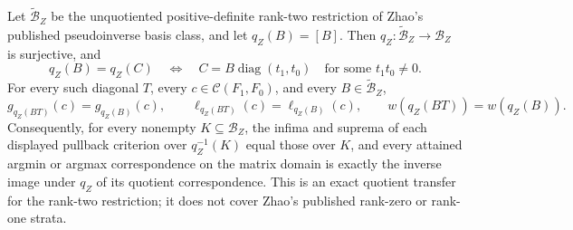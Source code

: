 Let \(\widetilde{\mathcal B}_Z\) be the unquotiented positive-definite rank-two restriction of Zhao's published pseudoinverse basis class, and let \(q_Z(B)=[B]\).  Then \(q_Z:\widetilde{\mathcal B}_Z\to\mathcal B_Z\) is surjective, and
\[
q_Z(B)=q_Z(C)
\quad\Longleftrightarrow\quad
C=B\operatorname{diag}(t_1,t_0)
\quad\text{for some }t_1t_0\ne0.
\]
For every such diagonal \(T\), every \(c\in\mathcal C(F_1,F_0)\), and every \(B\in\widetilde{\mathcal B}_Z\),
\[
g_{q_Z(BT)}(c)=g_{q_Z(B)}(c),\qquad
\ell_{q_Z(BT)}(c)=\ell_{q_Z(B)}(c),\qquad
w(q_Z(BT))=w(q_Z(B)).
\]
Consequently, for every nonempty \(K\subseteq\mathcal B_Z\), the infima and suprema of each displayed pullback criterion over \(q_Z^{-1}(K)\) equal those over \(K\), and every attained argmin or argmax correspondence on the matrix domain is exactly the inverse image under \(q_Z\) of its quotient correspondence.  This is an exact quotient transfer for the rank-two restriction; it does not cover Zhao's published rank-zero or rank-one strata.